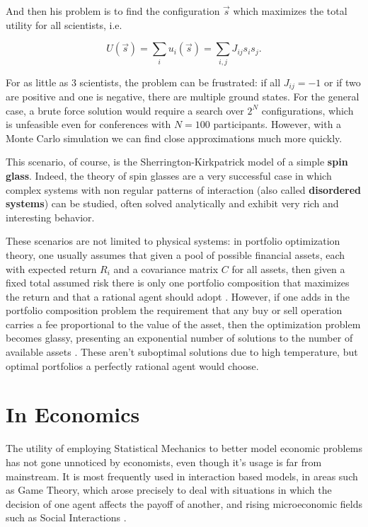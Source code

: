 And then his problem is to find the configuration $\vec{s}$ which maximizes the total utility for all scientists, i.e.

\begin{equation}
   U(\vec{s}) = \sum_{i} u_i(\vec{s}) = \sum_{i, j} J_{ij} s_i s_j.
\end{equation}

For as little as 3 scientists, the problem can be frustrated: if all $J_{ij} = -1$ or if two are positive and one is negative, there are multiple ground states. For the general case, a brute force solution would require a search over $2^N$ configurations, which is unfeasible even for conferences with $N=100$ participants. However, with a Monte Carlo simulation we can find close approximations much more quickly.

This scenario, of course, is the Sherrington-Kirkpatrick model of a simple \textbf{spin glass}. Indeed, the theory of spin glasses are a very successful case in which complex systems with non regular patterns of interaction (also called \textbf{disordered systems}) can be studied, often solved analytically and exhibit very rich and interesting behavior.

These scenarios are not limited to physical systems: in portfolio optimization theory, one usually assumes that given a pool of possible financial assets, each with expected return $R_i$ and a covariance matrix $C$ for all assets, then given a fixed total assumed risk there is only one portfolio composition that maximizes the return and that a rational agent should adopt \cite{elton2009}. However, if one adds in the portfolio composition problem the requirement that any buy or sell operation carries a fee proportional to the value of the asset, then the optimization problem becomes glassy, presenting an exponential number of solutions to the number of available assets \cite{galluccio1998, gabor1999}. These aren't suboptimal solutions due to high temperature, but optimal portfolios a perfectly rational agent would choose.


\section{In Economics}

The utility of employing Statistical Mechanics to better model economic problems has not gone unnoticed by economists, even though it's usage is far from mainstream. It is most frequently used in interaction based models, in areas such as Game Theory, which arose precisely to deal with situations in which the decision of one agent affects the payoff of another, and rising microeconomic fields such as Social Interactions \cite{ScheinkmanSocialInt}. 

